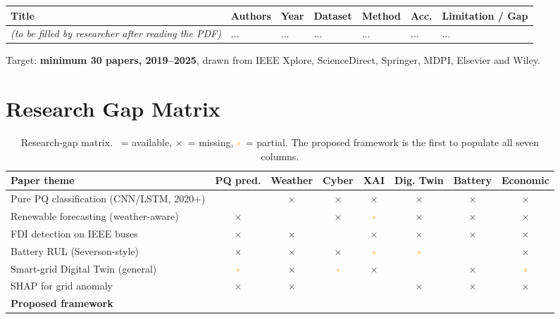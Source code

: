 \documentclass[11pt,a4paper]{article}
\newcommand{\yes}{\textcolor{checkgreen}{\checkmark}}
\newcommand{\no}{\textcolor{xred}{$\times$}}
\newcommand{\partialmark}{\textcolor{orange}{$\circ$}}
\begin{document}
\begin{longtable}{p{2.6cm}p{2.4cm}p{1.0cm}p{2.4cm}p{2.4cm}p{1.4cm}p{2.2cm}}
\toprule
\textbf{Title} & \textbf{Authors} & \textbf{Year} & \textbf{Dataset} &
\textbf{Method} & \textbf{Acc.} & \textbf{Limitation / Gap} \\
\midrule
\endhead

\textit{(to be filled by researcher after reading the PDF)} & ... & ... & ... & ... & ... & ... \\
\bottomrule
\end{longtable}

Target: \textbf{minimum 30 papers, 2019--2025}, drawn from IEEE Xplore,
ScienceDirect, Springer, MDPI, Elsevier and Wiley.

\section{Research Gap Matrix}
\label{sec:gapmatrix}

\begin{table}[H]
\centering
\small
\setlength{\tabcolsep}{4pt}
\begin{tabular}{p{5.0cm}ccccccc}
\toprule
\textbf{Paper theme} & \textbf{PQ pred.} & \textbf{Weather} &
\textbf{Cyber} & \textbf{XAI} & \textbf{Dig. Twin} & \textbf{Battery} &
\textbf{Economic} \\
\midrule
Pure PQ classification (CNN/LSTM, 2020+)     & \yes & \no & \no & \no & \no & \no & \no \\
Renewable forecasting (weather-aware)        & \no  & \yes & \no & \partialmark & \no & \no & \no \\
FDI detection on IEEE buses                  & \no  & \no & \yes & \no & \no & \no & \no \\
Battery RUL (Severson-style)                 & \no  & \no & \no & \partialmark & \partialmark & \yes & \no \\
Smart-grid Digital Twin (general)            & \partialmark & \no & \partialmark & \no & \yes & \no & \partialmark \\
SHAP for grid anomaly                        & \no  & \no & \yes & \yes & \no & \no & \no \\
\midrule
\rowcolor{accent!10}\textbf{Proposed framework} & \yes & \yes & \yes & \yes & \yes & \yes & \yes \\
\bottomrule
\end{tabular}
\caption{Research-gap matrix. \yes\ = available, \no\ = missing,
\partialmark\ = partial. The proposed framework is the first to populate
all seven columns.}
\end{table}
\end{document}
